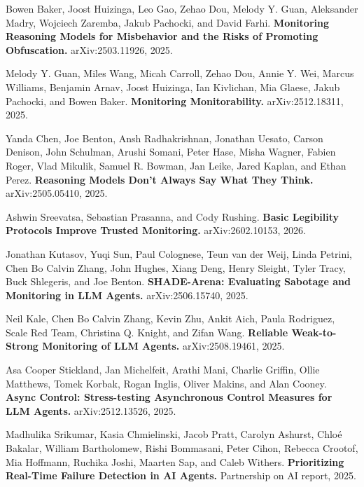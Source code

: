 \documentclass[11pt]{article}
\begin{document}
\begin{enumerate}[leftmargin=2em,itemsep=3pt,label={[\arabic*]}]
  \item Bowen Baker, Joost Huizinga, Leo Gao, Zehao Dou, Melody Y. Guan, Aleksander Madry, Wojciech Zaremba, Jakub Pachocki, and David Farhi. \textbf{Monitoring Reasoning Models for Misbehavior and the Risks of Promoting Obfuscation.} arXiv:2503.11926, 2025.

  \item Melody Y. Guan, Miles Wang, Micah Carroll, Zehao Dou, Annie Y. Wei, Marcus Williams, Benjamin Arnav, Joost Huizinga, Ian Kivlichan, Mia Glaese, Jakub Pachocki, and Bowen Baker. \textbf{Monitoring Monitorability.} arXiv:2512.18311, 2025.

  \item Yanda Chen, Joe Benton, Ansh Radhakrishnan, Jonathan Uesato, Carson Denison, John Schulman, Arushi Somani, Peter Hase, Misha Wagner, Fabien Roger, Vlad Mikulik, Samuel R. Bowman, Jan Leike, Jared Kaplan, and Ethan Perez. \textbf{Reasoning Models Don't Always Say What They Think.} arXiv:2505.05410, 2025.

  \item Ashwin Sreevatsa, Sebastian Prasanna, and Cody Rushing. \textbf{Basic Legibility Protocols Improve Trusted Monitoring.} arXiv:2602.10153, 2026.

  \item Jonathan Kutasov, Yuqi Sun, Paul Colognese, Teun van der Weij, Linda Petrini, Chen Bo Calvin Zhang, John Hughes, Xiang Deng, Henry Sleight, Tyler Tracy, Buck Shlegeris, and Joe Benton. \textbf{SHADE-Arena: Evaluating Sabotage and Monitoring in LLM Agents.} arXiv:2506.15740, 2025.

  \item Neil Kale, Chen Bo Calvin Zhang, Kevin Zhu, Ankit Aich, Paula Rodriguez, Scale Red Team, Christina Q. Knight, and Zifan Wang. \textbf{Reliable Weak-to-Strong Monitoring of LLM Agents.} arXiv:2508.19461, 2025.

  \item Asa Cooper Stickland, Jan Michelfeit, Arathi Mani, Charlie Griffin, Ollie Matthews, Tomek Korbak, Rogan Inglis, Oliver Makins, and Alan Cooney. \textbf{Async Control: Stress-testing Asynchronous Control Measures for LLM Agents.} arXiv:2512.13526, 2025.

  \item Madhulika Srikumar, Kasia Chmielinski, Jacob Pratt, Carolyn Ashurst, Chlo\'{e} Bakalar, William Bartholomew, Rishi Bommasani, Peter Cihon, Rebecca Crootof, Mia Hoffmann, Ruchika Joshi, Maarten Sap, and Caleb Withers. \textbf{Prioritizing Real-Time Failure Detection in AI Agents.} Partnership on AI report, 2025.


\end{enumerate}
\end{document}
